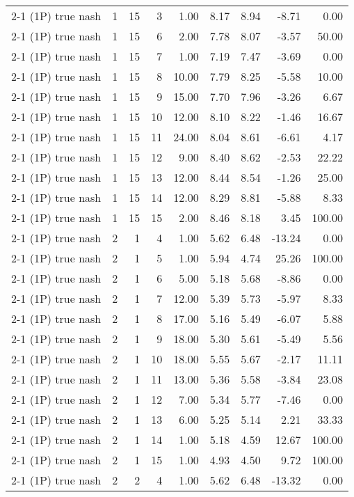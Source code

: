 \begin{tabular}{lrrrrrrrr}
2-1 (1P) true nash & 1 & 15 & 3 & 1.00 & 8.17 & 8.94 & -8.71 & 0.00 \\
2-1 (1P) true nash & 1 & 15 & 6 & 2.00 & 7.78 & 8.07 & -3.57 & 50.00 \\
2-1 (1P) true nash & 1 & 15 & 7 & 1.00 & 7.19 & 7.47 & -3.69 & 0.00 \\
2-1 (1P) true nash & 1 & 15 & 8 & 10.00 & 7.79 & 8.25 & -5.58 & 10.00 \\
2-1 (1P) true nash & 1 & 15 & 9 & 15.00 & 7.70 & 7.96 & -3.26 & 6.67 \\
2-1 (1P) true nash & 1 & 15 & 10 & 12.00 & 8.10 & 8.22 & -1.46 & 16.67 \\
2-1 (1P) true nash & 1 & 15 & 11 & 24.00 & 8.04 & 8.61 & -6.61 & 4.17 \\
2-1 (1P) true nash & 1 & 15 & 12 & 9.00 & 8.40 & 8.62 & -2.53 & 22.22 \\
2-1 (1P) true nash & 1 & 15 & 13 & 12.00 & 8.44 & 8.54 & -1.26 & 25.00 \\
2-1 (1P) true nash & 1 & 15 & 14 & 12.00 & 8.29 & 8.81 & -5.88 & 8.33 \\
2-1 (1P) true nash & 1 & 15 & 15 & 2.00 & 8.46 & 8.18 & 3.45 & 100.00 \\
2-1 (1P) true nash & 2 & 1 & 4 & 1.00 & 5.62 & 6.48 & -13.24 & 0.00 \\
2-1 (1P) true nash & 2 & 1 & 5 & 1.00 & 5.94 & 4.74 & 25.26 & 100.00 \\
2-1 (1P) true nash & 2 & 1 & 6 & 5.00 & 5.18 & 5.68 & -8.86 & 0.00 \\
2-1 (1P) true nash & 2 & 1 & 7 & 12.00 & 5.39 & 5.73 & -5.97 & 8.33 \\
2-1 (1P) true nash & 2 & 1 & 8 & 17.00 & 5.16 & 5.49 & -6.07 & 5.88 \\
2-1 (1P) true nash & 2 & 1 & 9 & 18.00 & 5.30 & 5.61 & -5.49 & 5.56 \\
2-1 (1P) true nash & 2 & 1 & 10 & 18.00 & 5.55 & 5.67 & -2.17 & 11.11 \\
2-1 (1P) true nash & 2 & 1 & 11 & 13.00 & 5.36 & 5.58 & -3.84 & 23.08 \\
2-1 (1P) true nash & 2 & 1 & 12 & 7.00 & 5.34 & 5.77 & -7.46 & 0.00 \\
2-1 (1P) true nash & 2 & 1 & 13 & 6.00 & 5.25 & 5.14 & 2.21 & 33.33 \\
2-1 (1P) true nash & 2 & 1 & 14 & 1.00 & 5.18 & 4.59 & 12.67 & 100.00 \\
2-1 (1P) true nash & 2 & 1 & 15 & 1.00 & 4.93 & 4.50 & 9.72 & 100.00 \\
2-1 (1P) true nash & 2 & 2 & 4 & 1.00 & 5.62 & 6.48 & -13.32 & 0.00 \\

\end{tabular}
